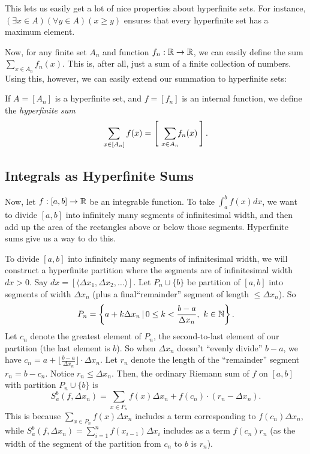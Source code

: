 This lets us easily get a lot of nice properties about hyperfinite sets. For instance, $(\exists x \in A)(\forall y \in A) (x \geq y)$ ensures that every hyperfinite set has a maximum element.

Now, for any finite set $A_n$ and function $f_n: \mathbb{R} \to \mathbb{R}$, we can easily define the sum $\sum_{x \in A_n} f_n(x)$. This is, after all, just a sum of a finite collection of numbers. Using this, however, we can easily extend our summation to hyperfinite sets:

\begin{defn}
    If $A = [A_n]$ is a hyperfinite set, and $f = [f_n]$ is an internal function, we define the \textit{hyperfinite sum}
    \[
    \sum_{x \in [A_n]} f(x) = \left[\ \ \sum_{\mathclap{x \in A_n}} f_n(x) \:\right].
    \] 
\end{defn}

\subsection{Integrals as Hyperfinite Sums}
Now, let $f: [a, b] \to \mathbb{R}$ be an integrable function. To take $\int_a^b f(x)dx$, we want to divide $[a, b]$ into infinitely many segments of infinitesimal width, and then add up the area of the rectangles above or below those segments. Hyperfinite sums give us a way to do this.

To divide $[a, b]$ into infinitely many segments of infinitesimal width, we will construct a hyperfinite partition where the segments are of infinitesimal width $dx > 0$. Say $dx = [\langle \Delta x_1, \Delta x_2, \ldots \rangle]$. Let $P_n \cup \{b\}$ be partition of $[a, b]$ into segments of width $\Delta x_n$ (plus a final``remainder'' segment of length $\leq \Delta x_n$). So
\[
P_n = \left\{a + k\Delta x_n \,|\, 0 \leq k < \frac{b-a}{\Delta x_n},\ k \in \mathbb{N}\right\}.
\]
Let $c_n$ denote the greatest element of $P_n$, the second-to-last element of our partition (the last element is $b$). So when $\Delta x_n$ doesn't ``evenly divide'' $b-a$, we have $c_n = a + \lfloor \frac{b-a}{\Delta x_n} \rfloor \cdot \Delta x_n$. Let $r_n$ denote the length of the ``remainder'' segment $r_n = b - c_n$. Notice $r_n \leq \Delta x_n$. Then, the ordinary Riemann sum of $f$ on $[a, b]$ with partition $P_n \cup \{b\}$ is 
\[ 
S_a^b(f, \Delta x_n) = \sum_{x \in P_n} f(x) \Delta x_n + f(c_n) \cdot (r_n - \Delta x_n). 
\]
This is because $\sum_{x \in P_n} f(x) \Delta x_n$ includes a term corresponding to $f(c_n) \Delta x_n$, while $S_a^b(f, \Delta x_n) = \sum_{i=1}^n f(x_{i-1})\Delta x_i$ includes as a term $f(c_n) r_n$ (as the width of the segment of the partition from $c_n$ to $b$ is $r_n$).

